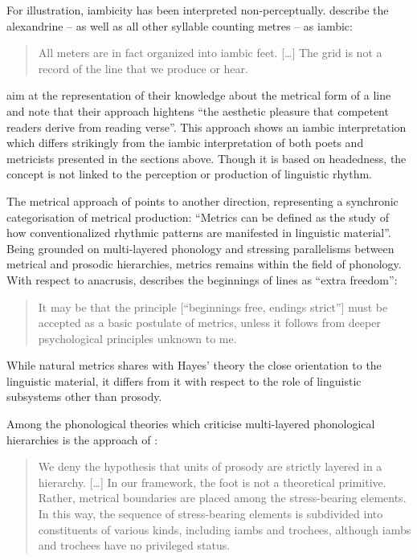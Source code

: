 \documentclass[output=paper
  ,nobabel
  ,uniformtopskip %
]{langscibook}
\begin{document}
For illustration, iambicity has been interpreted non-perceptually. \citet*[167;170]{FabbHalle2009} describe the  alexandrine – as well as all other  syllable counting metres – as iambic: 

\begin{quote}
All  meters are in fact organized into iambic feet. […] The grid is not a record of the line that we produce or hear.
\end{quote}

\noindent
\citet*[171]{FabbHalle2009} aim at the representation of their knowledge about the metrical form of a line and note that their approach hightens ``the aesthetic pleasure that competent readers derive from reading verse''. This approach shows an iambic interpretation which differs strikingly from the iambic interpretation of both poets and metricists presented in the sections above. Though it is based on headedness, the concept is not linked to the perception or production of linguistic rhythm. 

The metrical approach of \citet[221]{Hayes1989} points to another direction, representing a synchronic categorisation of metrical production: ``Metrics can be defined as the study of how conventionalized rhythmic patterns are manifested in linguistic material''. Being grounded on multi-layered phonology and stressing parallelisms between metrical and prosodic hierarchies, metrics remains within the field of phonology. With respect to anacrusis, \citet[256-257]{Hayes1989} describes the beginnings of lines as ``extra freedom'':

\begin{quote}
It may be that the principle [``beginnings free, endings strict''] must be accepted as a basic postulate of metrics, unless it follows from deeper psychological principles unknown to me.
\end{quote}

\noindent
While natural metrics shares with Hayes' theory the close orientation to the linguistic material, it
differs from it with respect to the role of linguistic subsystems other than prosody. 

Among the phonological theories which criticise multi-layered phonological hierarchies is the approach of \citet[439;440–441]{HalleIdsardi1995}:

\begin{quote}
We deny the hypothesis that units of prosody are strictly layered in a hierarchy. […] In our framework, the foot is not a theoretical primitive. Rather, metrical boundaries are placed among the stress-bearing elements. In this way, the sequence of stress-bearing elements is subdivided into constituents of various kinds, including iambs and trochees, although iambs and trochees have no privileged status. 
\end{quote}
\end{document}
